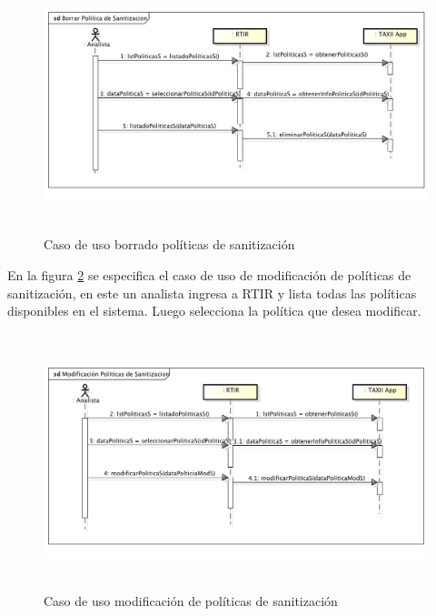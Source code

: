 \begin{figure}[H]
	\centering
	\includegraphics[width=5.7638in,height=2.9146in]{Analisis22-img/Analisis22-img018.png} 
	\caption{Caso de uso borrado políticas de sanitización}
	\label{fig.borradosanitizacion}
\end{figure}

\bigskip
\bigskip
En la figura \ref{fig.modificacionsanitizacion} se especifica el caso de uso de modificación de políticas de sanitización, en este un analista ingresa a
RTIR y lista todas las políticas disponibles en el sistema. Luego selecciona la política que desea modificar.

\begin{figure}[H]
	\centering
	\includegraphics[width=5.7638in,height=2.9256in]{Analisis22-img/Analisis22-img019.png} 
	\caption{Caso de uso modificación de políticas de sanitización}
	\label{fig.modificacionsanitizacion}
\end{figure}


